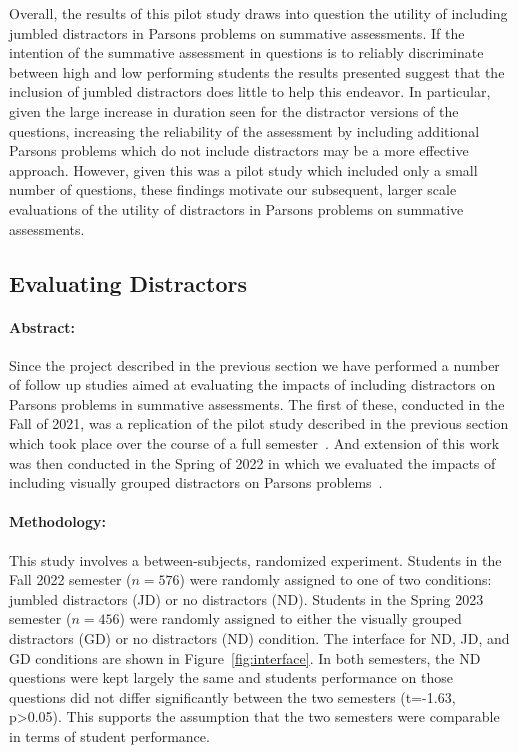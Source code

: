 \documentclass[authorversion,nonacm]{acmart}
\begin{document}
Overall, the results of this pilot study draws into question the utility of
including jumbled distractors in Parsons problems on summative assessments.
If the intention of the summative assessment in questions is to reliably
discriminate between high and low performing students the results presented
suggest that the inclusion of jumbled distractors does little to help this
endeavor. In particular, given the large increase in duration seen for the 
distractor versions of the questions, increasing the reliability of the
assessment by including additional Parsons problems which do not include
distractors may be a more effective approach.  However, given this was a pilot
study which included only a small number of questions, these findings motivate
our subsequent, larger scale evaluations of the utility of distractors in
Parsons problems on summative assessments.



\subsection{Evaluating Distractors}\label{sec:parsons}

\paragraph{Abstract:} Since the project described in the previous section we
have performed a number of follow up studies aimed at evaluating the impacts of
including distractors on Parsons problems in summative assessments.  The first
of these, conducted in the Fall of 2021, was a replication of  the pilot study
described in the previous section which took place over the course of a full
semester~\cite{smith2023investigating}. And extension of this work was then
conducted in the Spring of 2022 in which we evaluated the impacts of including
visually grouped distractors on Parsons problems~\cite{smith2023comparing}. 

\paragraph{Methodology:} This study involves a between-subjects, randomized
experiment. Students in the Fall 2022 semester ($n=576$) were randomly assigned
to one of two conditions: jumbled distractors (JD) or no distractors (ND).
Students in the Spring 2023 semester ($n=456$) were randomly assigned to either
the visually grouped distractors (GD) or no distractors (ND) condition. The
interface for ND, JD, and GD conditions are shown in
Figure~\ref{fig:interface}.  In both semesters, the ND questions were kept
largely the same and students performance on those questions did not differ
significantly between the two semesters (t=-1.63, p>0.05). This supports
the assumption that the two semesters were comparable in terms of student
performance.
\end{document}
